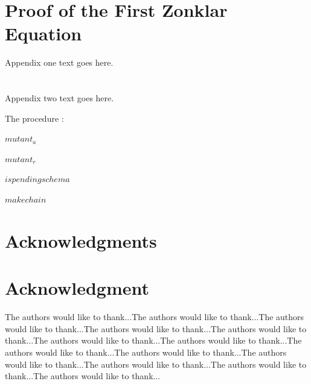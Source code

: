 \documentclass[10pt,journal,cspaper,compsoc]{IEEEtran}
\begin{document}
\appendices
\section{Proof of the First Zonklar Equation}
Appendix one text goes here.

\section{}
Appendix two text goes here.

The procedure :

$mutant_a$

$mutant_r$

$is pending schema$

$makechain$


\ifCLASSOPTIONcompsoc
  \section*{Acknowledgments}
\else
  \section*{Acknowledgment}
\fi


The authors would like to thank...The authors would like to thank...The authors would like to thank...The authors would like to thank...The authors would like to thank...The authors would like to thank...The authors would like to thank...The authors would like to thank...The authors would like to thank...The authors would like to thank...The authors would like to thank...The authors would like to thank...The authors would like to thank...


\ifCLASSOPTIONcaptionsoff
  \newpage
\fi




\end{document}
